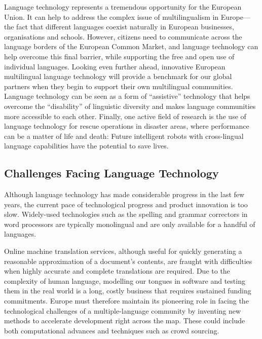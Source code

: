 \begin{multicols}{2}
Language technology represents a tremendous opportunity for the European Union. It can help to address the complex issue of multilingualism in Europe—the fact that different languages coexist naturally in European businesses, organisations and schools. However, citizens need to communicate across the language borders of the European Common Market, and language technology can help overcome this final barrier, while supporting the free and open use of individual languages. Looking even further ahead, innovative European multilingual language technology will provide a benchmark for our global partners when they begin to support their own multilingual communities. Language technology can be seen as a form of “assistive” technology that helps overcome the “disability” of linguistic diversity and makes language communities more accessible to each other. Finally, one active field of research is the use of language technology for rescue operations in disaster areas, where performance can be a matter of life and death: Future intelligent robots with cross-lingual language capabilities have the potential to save lives.

\subsection{Challenges Facing Language Technology}

Although language technology has made considerable progress in the last few years, the current pace of technological progress and product innovation is too slow. Widely-used technologies such as the spelling and grammar correctors in word processors are typically monolingual and are only available for a handful of languages.


Online machine translation services, although useful for quickly generating a reasonable approximation of a document’s contents, are fraught with difficulties when highly accurate and complete translations are required. Due to the complexity of human language, modelling our tongues in software and testing them in the real world is a long, costly business that requires sustained funding commitments. Europe must therefore maintain its pioneering role in facing the technological challenges of a multiple-language community by inventing new methods to accelerate development right across the map. These could include both computational advances and techniques such as crowd sourcing.


\end{multicols}
